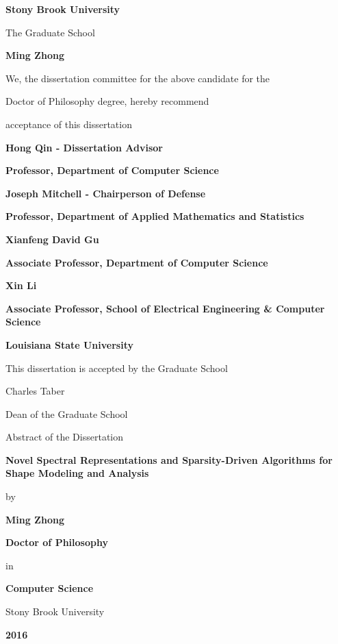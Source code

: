 \documentclass[12pt,letterpaper,twosided]{report}
\numberwithin{equation}{section}
\begin{document}
\centerline{\bf{Stony Brook University}}
\vspace*{1\baselineskip}
\centerline{The Graduate School}
\vspace*{2\baselineskip}
\centerline{\bf{Ming Zhong}}
\vspace*{2\baselineskip}
\centerline{We, the dissertation committee for the above candidate for the}
\vspace*{1\baselineskip}
\centerline{Doctor of Philosophy degree, hereby recommend}
\vspace*{1\baselineskip}
\centerline{acceptance of this dissertation}
\vspace*{2\baselineskip}
\centerline{\bf{Hong Qin - Dissertation Advisor}}
\centerline{\bf{Professor, Department of Computer Science}}
\vspace*{2\baselineskip}
\centerline{\bf{Joseph Mitchell - Chairperson of Defense}}
\centerline{\bf{Professor, Department of Applied Mathematics and Statistics}}
\vspace*{2\baselineskip}
\centerline{\bf{Xianfeng David Gu}}
\centerline{\bf{Associate Professor, Department of Computer Science}}
\vspace*{2\baselineskip}
\centerline{\bf{Xin Li}}
\centerline{\bf{Associate Professor, School of Electrical Engineering \& Computer Science}}
\centerline{\bf{Louisiana State University}}
\vspace*{2\baselineskip}
\centerline{This dissertation is accepted by the Graduate School}
\vspace*{3\baselineskip}
\centerline{Charles Taber}
\centerline{Dean of the Graduate School}

\afterpage{\null\newpage}

\centerline{Abstract of the Dissertation}
\vspace*{1\baselineskip}
\centerline{\bf{Novel Spectral Representations and Sparsity-Driven
Algorithms for Shape Modeling and Analysis}}
\vspace*{1\baselineskip}
\centerline{by}
\vspace*{1\baselineskip}
\centerline{\bf{Ming Zhong}}
\vspace*{1\baselineskip}
\centerline{\bf{Doctor of Philosophy}}
\vspace*{1\baselineskip}
\centerline{in}
\vspace*{1\baselineskip}
\centerline{\bf{Computer Science}}
\vspace*{1\baselineskip}
\centerline{Stony Brook University}
\vspace*{1\baselineskip}
\centerline{\bf{2016}}
\vspace*{2\baselineskip}
\end{document}
